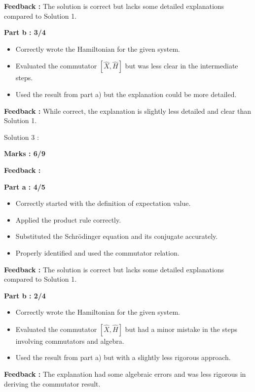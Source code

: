\documentclass[a4paper,11pt]{article}
\begin{document}
\textbf{Feedback :}
The solution is correct but lacks some detailed explanations compared to Solution 1.

\textbf{Part b : 3/4}

\begin{itemize}
    \item Correctly wrote the Hamiltonian for the given system.
    \item Evaluated the commutator $[\hat{X}, \hat{H}]$ but was less clear in the intermediate steps.
    \item Used the result from part a) but the explanation could be more detailed.
\end{itemize}

\textbf{Feedback :}
While correct, the explanation is slightly less detailed and clear than Solution 1.



Solution 3 :

\textbf{Marks : 6/9}

\textbf{Feedback :}

\textbf{Part a : 4/5}

\begin{itemize}
    \item Correctly started with the definition of expectation value.
    \item Applied the product rule correctly.
    \item Substituted the Schrödinger equation and its conjugate accurately.
    \item Properly identified and used the commutator relation.
\end{itemize}

\textbf{Feedback :}
The solution is correct but lacks some detailed explanations compared to Solution 1.


\textbf{Part b : 2/4}

\begin{itemize}
    \item Correctly wrote the Hamiltonian for the given system.
    \item Evaluated the commutator $[\hat{X}, \hat{H}]$ but had a minor mistake in the steps involving commutators and algebra.
    \item Used the result from part a) but with a slightly less rigorous approach.
\end{itemize}

\textbf{Feedback :}
The explanation had some algebraic errors and was less rigorous in deriving the commutator result.
\end{document}
